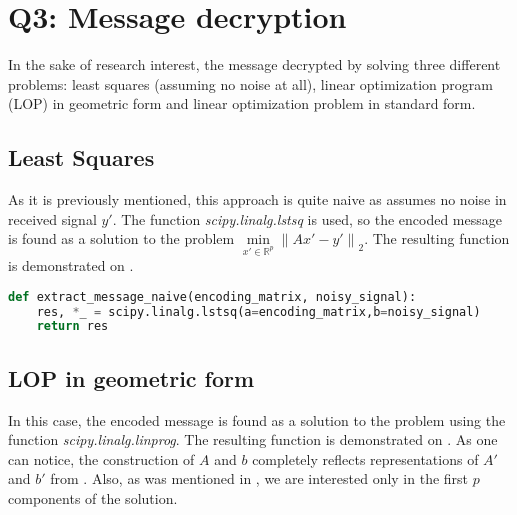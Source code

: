 \documentclass{article}
\def\R{\mathbb{R}}
\begin{document}

\section{Q3: Message decryption}

In the sake of research interest, the message decrypted by solving three different problems: least squares (assuming no noise at all), linear optimization program (LOP) in geometric form and linear optimization problem in standard form.

\subsection{Least Squares}
As it is previously mentioned, this approach is quite naive as assumes no noise in received signal $y'$. The function \textit{scipy.linalg.lstsq} is used, so the encoded message is found as a solution to the problem $\min\limits_{x' \in \R^p} {\| Ax'-y' \|}_2$. The resulting function is demonstrated on .

\begin{lstlisting}[language=Python, caption={Naive message decryption}, label={lst:naive}]
  def extract_message_naive(encoding_matrix, noisy_signal):
    res, *_ = scipy.linalg.lstsq(a=encoding_matrix,b=noisy_signal)
    return res
\end{lstlisting}


\subsection{LOP in geometric form}
In this case, the encoded message is found as a solution to the problem  using the function \textit{scipy.linalg.linprog}. The resulting function is demonstrated on . As one can notice, the construction of $A$ and $b$ completely reflects representations of $A'$ and $b'$ from . Also, as was mentioned in , we are interested only in the first $p$ components of the solution.
\end{document}
